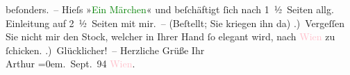                beſonders. – Hieſs »\textcolor{green}{Ein Märchen}{}\ledrightnote{\textcolor{green}{Ein Märchen}}« und beſchäftigt
               ſich nach 1 ½ Seiten allg. Einleitung auf 2 ½ Seiten {\pb}mit mir. – (Beſtellt; Sie kriegen ihn da{\geminationn})\pend
           .) Vergeſſen Sie nicht mir den Stock, welcher in Ihrer Hand ſo elegant wird, nach
                  \textcolor{pink}{Wien}{}\ledrightnote{\textcolor{pink}{Wien}} zu ſchicken.\pend
           .) Glücklicher! –\pend
           \pstart
           Herzliche Grüße Ihr{\\[\baselineskip]}\spacefill\mbox{Arthur}\pend
           \leftskip=0em{}. Sept. 94{ }\textcolor{pink}{Wien}{}\ledrightnote{\textcolor{pink}{Wien}}.\pend
           \endnumbering{}  
      